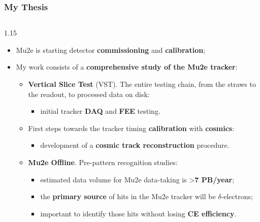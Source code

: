 \documentclass{beamer}
\begin{document}
\begin{frame}
    \frametitle{My Thesis}
    
\begin{columns}
   \begin{column}{1.15\framewidth} 
         \setlength{\leftmargini}{1.3em}
\vspace{-4mm}
\begin{itemize}
\item Mu2e is starting detector \textbf{commissioning} and \textbf{calibration};
     \vspace{4mm}
\item My work consists of a \textbf{comprehensive study of the Mu2e tracker}:
\vspace{3mm}
  \begin{itemize}
    \item \textbf{Vertical Slice Test} (VST). The entire 
testing chain, from the straws to the readout, to processed data on disk:
     \vspace{2mm}
 \begin{itemize}
     \item initial tracker \textbf{DAQ} and \textbf{FEE} testing.
     \end{itemize}
     \vspace{3mm}

    \item First steps towards the tracker timing \textbf{calibration} with \textbf{cosmics}:
         \vspace{2mm}
    \begin{itemize}
            \item development of a \textbf{cosmic track reconstruction} procedure.
    \end{itemize}
         \vspace{3mm}

    \item \textbf{Mu2e Offline}. Pre-pattern recognition studies:
         \vspace{2mm}
    \begin{itemize}
        \item estimated data volume for Mu2e data-taking 
is >\textbf{7 PB/year};
     \vspace{1.5mm}
\item the \textbf{primary source} of hits in the 
Mu2e tracker will be $\delta$-electrons;
     \vspace{1.5mm}
\item important to identify those hits without losing \textbf{CE efficiency}.
    \end{itemize}
        \end{itemize}
\end{itemize}
 \end{column}
 \end{columns}
     

\end{frame}
\end{document}
